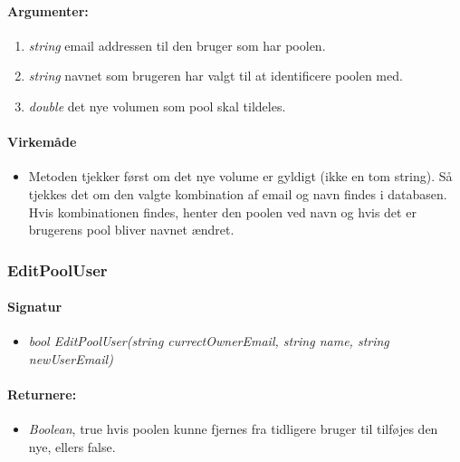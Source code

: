 \paragraph{Argumenter:}
\begin{enumerate}
	\item \textit{string} email addressen til den bruger som har poolen.
	\item \textit{string} navnet som brugeren har valgt til at identificere poolen med.
	\item \textit{double} det nye volumen som pool skal tildeles.
\end{enumerate}

\paragraph{Virkemåde}
\begin{itemize}
	\item Metoden tjekker først om det nye volume er gyldigt (ikke en tom string). Så tjekkes det om den valgte kombination af email og navn findes i databasen. Hvis kombinationen findes, henter den poolen ved navn og hvis det er brugerens pool bliver navnet ændret.
\end{itemize}





\subsubsection{EditPoolUser}%







\paragraph{Signatur}
\begin{itemize}
	\item \textit{bool EditPoolUser(string currectOwnerEmail, string name, string newUserEmail)}
\end{itemize}

\paragraph{Returnere:}
\begin{itemize}
	\item \textit{Boolean}, true hvis poolen kunne fjernes fra tidligere bruger til tilføjes den nye, ellers false.
\end{itemize}

